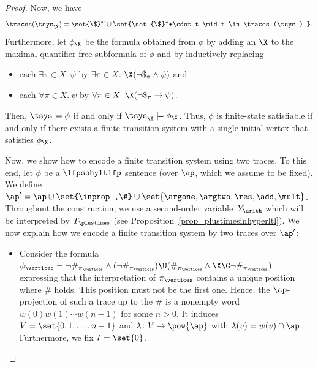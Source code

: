 \begin{proof}
Now, we have
\[
\traces(\tsys_{\X}) = \set{\$}^\omega \cup \set{\set{\$}^+\cdot t \mid t \in \traces(\tsys) }.
\]
Furthermore, let $\phi_{\X}$ be the formula obtained from $\phi$ by adding an $\X$ to the maximal quantifier-free subformula of $\phi$ and by inductively replacing 
\begin{itemize}
\item each $\exists \pi \in X.\ \psi$ by $\exists \pi \in X.\ \X(\neg\$_\pi \wedge \psi)$ and
\item each $\forall \pi \in X.\ \psi$ by $\forall \pi \in X.\ \X(\neg\$_\pi \rightarrow \psi)$.
\end{itemize}
Then, $\tsys \models \phi$ if and only if $\tsys_{\X} \models \phi_{\X}$.
Thus, $\phi$ is finite-state satisfiable if and only if there exists a finite transition system with a single initial vertex that satisfies $\phi_{\X}$.

Now, we show how to encode a finite transition system using two traces. 
To this end, let $\phi$ be a $\lfpsohyltlfp$ sentence (over $\ap$, which we assume to be fixed).
We define $\ap' =  \ap \cup \set{\inprop,\#} \cup \set{\argone, \argtwo, \res, \add, \mult}$. 
Throughout the construction, we use a second-order variable~$Y_\arith$ which will be interpreted by $T_\plustimes$ (see Proposition~\ref{prop_plustimesinhyperltl}).
We now explain how we encode a finite transition system by two traces over $\ap'$:
\begin{itemize}
	\item Consider the formula~$\phi_\vertices = \neg \#_{\pi_\vertices} \wedge (\neg \#_{\pi_\vertices}) \U (\#_{\pi_\vertices} \wedge \X\G \neg \#_{\pi_\vertices})$ expressing that the interpretation of ${\pi_\vertices}$ contains a unique position where $\#$ holds. This position must not be the first one. Hence, the $\ap$-projection of such a trace up to the $\#$ is a nonempty word~$w(0)w(1)\cdots w(n-1)$ for some $n > 0$. 
	It induces $V = \set{0,1,\ldots, n-1}$ and $\lambda \colon V \rightarrow \pow{\ap}$ with $\lambda(v) = w(v) \cap \ap$. Furthermore, we fix $I = \set{0}$.
	

\end{itemize}
\end{proof}
